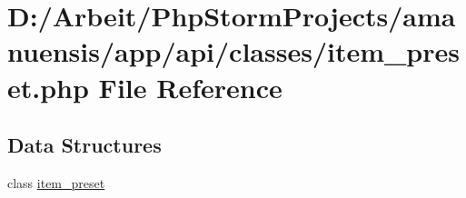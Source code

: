 \hypertarget{item__preset_8php}{}\section{D\+:/\+Arbeit/\+Php\+Storm\+Projects/amanuensis/app/api/classes/item\+\_\+preset.php File Reference}
\label{item__preset_8php}
\subsection*{Data Structures}
\begin{DoxyCompactItemize}
\item 
class \hyperlink{classitem__preset}{item\+\_\+preset}
\end{DoxyCompactItemize}
